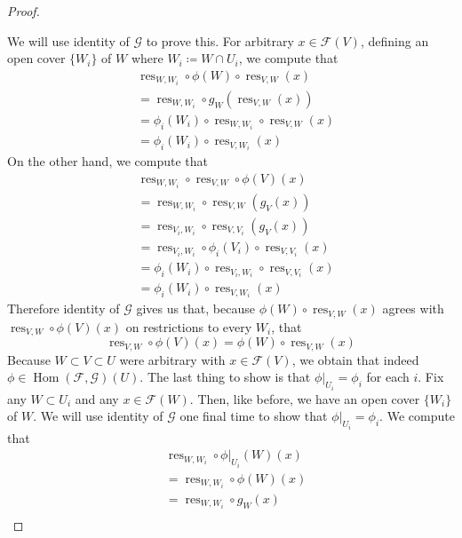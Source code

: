 \documentclass{article}
\newcommand{\fF}{\mathscr{F}}
\newcommand{\fG}{\mathscr{G}}
\DeclareMathOperator{\res}{res}
\DeclareMathOperator{\Hom}{Hom}
\begin{document}
\begin{proof}
    \begin{center}
    \end{center}
    We will use identity of $\fG$ to prove this. For arbitrary $x\in \fF(V)$, defining an open cover $\{W_i\}$ of $W$ where $W_i\coloneqq W\cap U_i$, we compute that
    \begin{align*}
        &\res_{W,W_i}\circ \phi(W)\circ \res_{V,W}(x)\\
        &=\res_{W,W_i}\circ g_W(\res_{V,W}(x))\\
        &=\phi_i(W_i)\circ \res_{W,W_i}\circ \res_{V,W}(x)\\
        &=\phi_i(W_i)\circ \res_{V,W_i}(x)
    \end{align*}
    On the other hand, we compute that
    \begin{align*}
        &\res_{W,W_i}\circ \res_{V,W}\circ \phi(V)(x)\\
        &=\res_{W,W_i}\circ \res_{V,W}(g_V(x))\\
        &=\res_{V_i,W_i}\circ\res_{V,V_i}(g_V(x))\\
        &=\res_{V_i,W_i}\circ \phi_i(V_i)\circ \res_{V,V_i}(x)\\
        &=\phi_i(W_i)\circ \res_{V_i,W_i}\circ \res_{V,V_i}(x)\\
        &=\phi_i(W_i)\circ \res_{V,W_i}(x)
    \end{align*}
    Therefore identity of $\fG$ gives us that, because $\phi(W)\circ \res_{V,W}(x)$ agrees with $\res_{V,W}\circ \phi(V)(x)$ on restrictions to every $W_i$, that
    \[
    \res_{V,W}\circ \phi(V)(x)=\phi(W)\circ \res_{V,W}(x)
    \]
    Because $W\subset V\subset U$ were arbitrary with $x\in \fF(V)$, we obtain that indeed $\phi\in \Hom(\fF,\fG)(U)$. The last thing to show is that $\phi\vert_{U_i}=\phi_i$ for each $i$. Fix any $W\subset U_i$ and any $x\in \fF(W)$. Then, like before, we have an open cover $\{W_i\}$ of $W$. We will use identity of $\fG$ one final time to show that $\phi\vert_{U_i}=\phi_i$. We compute that
    \begin{align*}
        &\res_{W,W_i}\circ \phi\vert_{U_i}(W)(x)\\
        &=\res_{W,W_i}\circ \phi(W)(x)\\
        &=\res_{W,W_i}\circ g_W(x)\\

\end{align*}
\end{proof}
\end{document}
